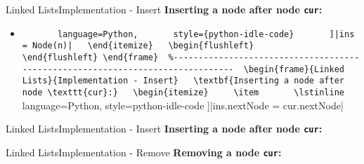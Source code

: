 
\begin{frame}{Linked Lists}{Implementation - Insert}
  \textbf{Inserting a node after node \texttt{cur}:}
  \begin{itemize}
    \item
      \lstinline[
      language=Python,
      style={python-idle-code}
      ]|ins = Node(n)|
  \end{itemize}
  \begin{flushleft}
    
  \end{flushleft}
\end{frame}


\begin{frame}{Linked Lists}{Implementation - Insert}
  \textbf{Inserting a node after node \texttt{cur}:}
  \begin{itemize}
    \item
      \lstinline[
        language=Python,
        style={python-idle-code}
      ]|ins.nextNode = cur.nextNode|
  \end{itemize}
  \begin{flushleft}
    
  \end{flushleft}
\end{frame}


\begin{frame}{Linked Lists}{Implementation - Insert}
  \textbf{Inserting a node after node \texttt{cur}:}
  \begin{flushleft}
    
  \end{flushleft}
\end{frame}


\begin{frame}{Linked Lists}{Implementation - Remove}
  \textbf{Removing a node \texttt{cur}:}
  \begin{flushleft}
    
  \end{flushleft}
\end{frame}

